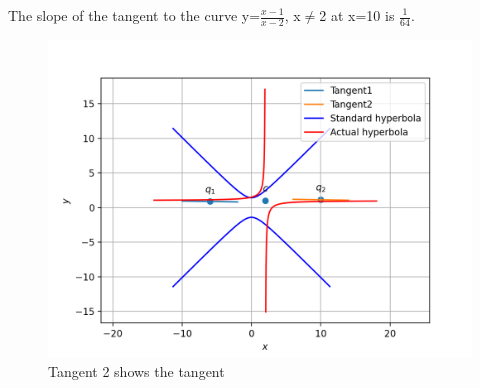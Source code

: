 \documentclass[journal,12pt,twocolumn]{IEEEtran}
\begin{document}
The slope of the tangent to the curve y=$\frac{x-1}{x-2}$, x$\not=$2 at x=10 is $\frac{1}{64}$.
  \begin{figure}[h!]
	\centering
	\includegraphics[width=\columnwidth]{Assignment_7.png}
	\caption{Tangent 2 shows the tangent}
	\label{myfig}
\end{figure}
 
\end{document}
